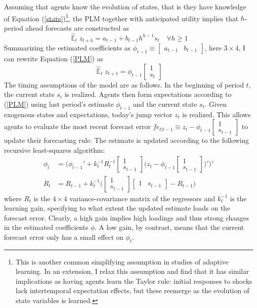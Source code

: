 \documentclass[11pt]{article}
\renewcommand{\[}{\begin{equation}}
\renewcommand{\]}{\end{equation}}
\DeclareMathOperator{\E}{\mathbb{E}}
\begin{document}
Assuming that agents know the evolution of states, that is they have knowledge of Equation (\ref{state})\footnote{This is another common simplifying assumption in studies of adaptive learning. In an extension, I relax this assumption and find that it has similar implications as having agents learn the Taylor rule: initial responses to shocks lack intertemporal expectation effects, but these reemerge as the evolution of state variables is learned.}, the PLM together with anticipated utility implies that $h$-period ahead forecasts are constructed as
\begin{equation}
\hat{\E}_t z_{t+h} = a_{t-1} + b_{t-1}h^{h-1}s_t  \quad \forall h\geq 1 \label{PLM_fcst_general}
\end{equation}
Summarizing the estimated coefficients as $\phi_{t-1} \equiv \begin{bmatrix}a_{t-1} & b_{t-1}\end{bmatrix}$, here $3\times 4$, I can rewrite Equation (\ref{PLM}) as 
\begin{equation} 
\hat{\E}_t z_{t+1} = \phi_{t-1}\begin{bmatrix} 1 \\ s_{t} \end{bmatrix} \label{PLMcompact}
\end{equation}
The timing assumptions of the model are as follows. In the beginning of period $t$, the current state $s_t$ is realized. Agents then form expectations according to (\ref{PLM}) using last period's estimate $\phi_{t-1}$ and the current state $s_t$. Given exogenous states and expectations, today's jump vector $z_t$ is realized. This allows agents to evaluate the most recent forecast error $fe_{t|t-1} \equiv z_t - \phi_{t-1}\begin{bmatrix} 1\\ s_{t-1}\end{bmatrix}$ to update their forecasting rule. The estimate is updated according to the following recursive least-squares algorithm:
\begin{align}
\phi_t  & = \bigg( \phi_{t-1}' + k_t^{-1} R_t^{-1}\begin{bmatrix} 1 \\ s_{t-1} \end{bmatrix}\bigg(z_{t} - \phi_{t-1} \begin{bmatrix} 1 \\ s_{t-1} \end{bmatrix} \bigg)' \bigg)' \\
R_t &= R_{t-1} +  k_t^{-1} \bigg( \begin{bmatrix} 1 \\ s_{t-1} \end{bmatrix} \begin{bmatrix} 1 & s_{t-1} \end{bmatrix}  - R_{t-1} \bigg)
\end{align}
where $R_t$ is the $4\times 4$ variance-covariance matrix of the regressors and $k_t^{-1}$ is the learning gain, specifying to what extent the updated estimate loads on the forecast error. Clearly, a high gain implies high loadings and thus strong changes in the estimated coefficients $\phi$. A low gain, by contrast, means that the current forecast error only has a small effect on $\phi_t$.
\end{document}
